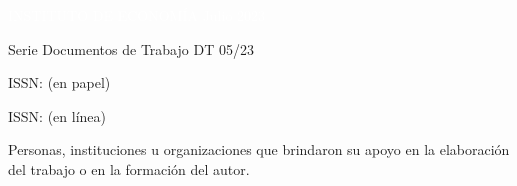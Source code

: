 \documentclass[12pt]{article}
\begin{document}
\vspace{2cm}

\begin{mdframed}[backgroundcolor=myred, linecolor=myred, leftmargin=-40pt, rightmargin=-40pt]

\hspace{5cm} \textcolor{white}{INSTITUTO DE ECONOMÍA} \hfill \textcolor{white}{Julio 2023} %
\end{mdframed}

\vspace{-0.7cm}


\begin{mdframed}[backgroundcolor=white, linecolor=white, leftmargin=-40pt, rightmargin=-40pt]

\small

\hspace{5cm} Serie Documentos de Trabajo \hfill DT 05/23 %

\end{mdframed}

\vspace{4cm}

\begin{flushright}

ISSN: \dashuline{\, \textcolor{mygrey}{1510-9305}  \, } \quad \quad (en papel)


ISSN: \dashuline{ \, \textcolor{mygrey}{1688-5090}  \, } \quad \quad (en línea)
    
\end{flushright}    


\newpage




\null \vspace{7cm}

\noindent \small  Personas, instituciones u organizaciones que brindaron su apoyo en la elaboración del trabajo o en la formación del autor.
\end{document}
